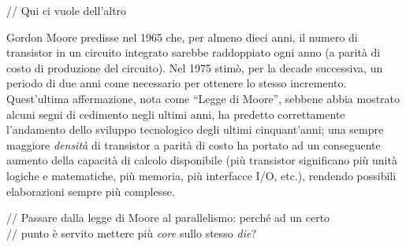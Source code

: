 // Qui ci vuole dell'altro

Gordon Moore predisse nel 1965\citep{GMoore} che, 
per almeno dieci anni, il numero di transistor in un circuito integrato 
sarebbe raddoppiato ogni anno (a parità di costo di produzione del circuito).
 Nel 1975 stimò, per la decade successiva, un periodo di due anni come 
necessario per ottenere lo stesso incremento. Quest'ultima affermazione, 
nota come ``Legge di Moore'', sebbene abbia mostrato alcuni segni di
cedimento negli ultimi anni\citep{MooresLaw}, ha 
predetto correttamente l'andamento dello sviluppo tecnologico degli ultimi
cinquant'anni; una sempre maggiore \emph{densità} di transistor a parità
di costo ha portato ad un conseguente aumento della capacità di calcolo 
disponibile (più transistor significano più unità logiche e matematiche,
più memoria, più interfacce I/O, etc.), rendendo possibili elaborazioni
sempre più complesse.

// Passare dalla legge di Moore al parallelismo: perché ad un certo \\
// punto è servito mettere più \emph{core} sullo stesso \emph{die}?

